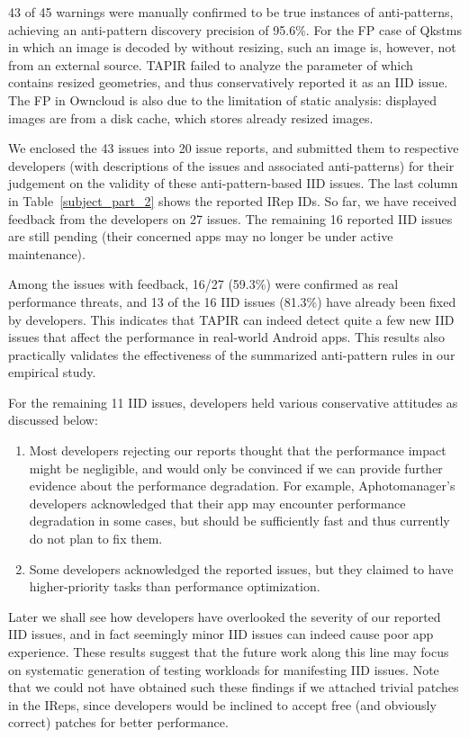43 of 45 warnings were manually confirmed to be true instances of anti-patterns,
achieving an anti-pattern discovery precision of 95.6\%.
For the FP case of Qkstms
in which an image is decoded by  without resizing, such an image is, however, not from an external source.
TAPIR failed to analyze the  parameter of  which contains resized geometries,
and thus conservatively reported it as an IID issue.
The FP in Owncloud is also due to the limitation of static analysis:
displayed images are from a disk cache, which stores already resized images.

We enclosed the 43 issues into 20 issue reports, and submitted them to respective developers
(with descriptions of the issues and associated anti-patterns)
for their judgement on the validity of these anti-pattern-based IID issues. The last column in Table~\ref{subject_part_2} shows the reported IRep IDs.
So far, we have received feedback from the developers on 27 issues.
The remaining 16 reported IID issues are still pending (their concerned apps may no longer be under active maintenance).

Among the issues with feedback,
16/27 (59.3\%) were confirmed as real performance threats, and 13 of the 16 IID issues (81.3\%) have already been fixed by developers.
This indicates that TAPIR can indeed detect quite a few new IID issues that affect the performance in real-world Android apps. This results also practically validates the effectiveness of the summarized anti-pattern rules in our empirical study.

For the remaining 11 IID issues, developers held various conservative attitudes as discussed below:

\begin{enumerate}
  \item Most developers rejecting our reports thought that the performance impact might be negligible, and would only be convinced if we can provide further evidence about the performance degradation.
  For example, Aphotomanager's developers acknowledged that their app may encounter performance degradation in some cases, but should be sufficiently fast and thus currently do not plan to fix them.
  \item Some developers acknowledged the reported issues, but they claimed to have higher-priority tasks than performance optimization.
\end{enumerate}

Later we shall see how developers have overlooked the severity of our reported IID issues,
and in fact seemingly minor IID issues can indeed cause poor app experience.
These results suggest that the future work along this line may focus on systematic generation of testing workloads for manifesting IID issues.
Note that we could not have obtained such these findings if we attached trivial patches in the IReps, since developers would be inclined to accept free (and obviously correct) patches for better performance.

